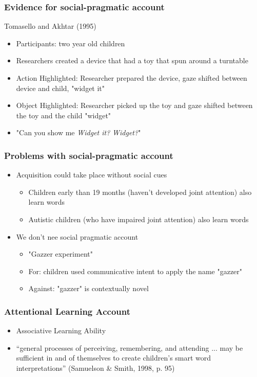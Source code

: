 \documentclass{beamer}
\begin{document}
\begin{frame}
\frametitle{Evidence for social-pragmatic account}
Tomasello and Akhtar (1995)
\begin{itemize}
\item Participants: two year old children
\item Researchers created a device that had a toy that spun around a turntable
\item Action Highlighted: Researcher prepared the device, gaze shifted between device and child, "widget it"
\item Object Highlighted: Researcher picked up the toy and gaze shifted between the toy and the child "widget"
\item "Can you show me \textit{Widget it?} \textit{Widget?}"
\end{itemize}
\end{frame}
\begin{frame}
\frametitle{Problems with social-pragmatic account}
\begin{itemize}
\item Acquisition could take place without social cues
\begin{itemize}
    \item Children early than 19 months (haven't developed joint attention) also learn words
    \item Autistic children (who have impaired joint attention) also learn words
\end{itemize}
\pause
\item We don't nee social pragmatic account
\begin{itemize}
    \item "Gazzer experiment"
    \item For: children used communicative intent to apply the name "gazzer"
    \item Against: "gazzer" is contextually novel
\end{itemize}
\end{itemize}
\end{frame}
\begin{frame}
\frametitle{Attentional Learning Account}
\begin{itemize}
\item Associative Learning Ability 
\item  “general processes of perceiving, remembering, and attending ... may be sufficient in and of themselves to create children’s smart word interpretations” (Samuelson & Smith, 1998, p. 95)
\end{itemize}
\end{frame}
\end{document}
